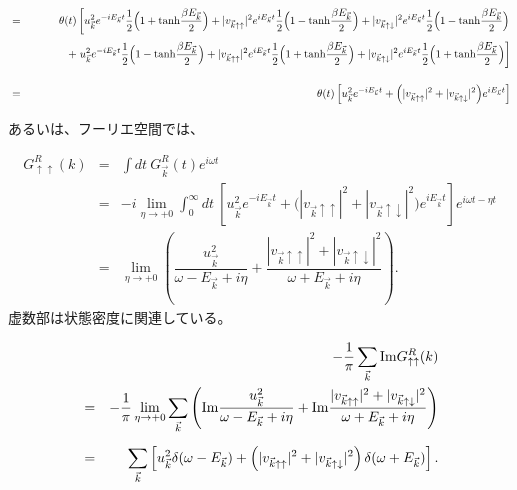\documentclass[uplatex,a4j,12pt,dvipdfmx]{jsarticle}
\begin{document}
\begin{eqnarray}
	&=&
	\theta(t)
	\left[
		u_{\vec{k}}^{2}
		e^{ - i E_{\vec{k}} t }
		\dfrac{1}{2}
		\Big( 1 + {\rm tanh}\dfrac{\beta E_{\vec{k}}}{2} \Big)
		+
		|v_{\vec{k} \uparrow \uparrow}|^{2}
		e^{ i E_{\vec{k}} t }
		\dfrac{1}{2}
		\Big( 1 - {\rm tanh}\dfrac{\beta E_{\vec{k}}}{2} \Big)
		+
		|v_{\vec{k} \uparrow \downarrow}|^{2}
		e^{ i E_{\vec{k}} t }
		\dfrac{1}{2}
		\Big( 1 - {\rm tanh}\dfrac{\beta E_{\vec{k}}}{2} \Big)
		\right.
		\nonumber \\[1mm] && \hspace{12mm} +
	\left.
	u_{\vec{k}}^{2}
	e^{ - i E_{\vec{k}} t }
	\dfrac{1}{2}
	\Big( 1 - {\rm tanh}\dfrac{\beta E_{\vec{k}}}{2} \Big)
	+
	|v_{\vec{k} \uparrow \uparrow}|^{2}
	e^{ i E_{\vec{k}} t }
	\dfrac{1}{2}
	\Big( 1 + {\rm tanh}\dfrac{\beta E_{\vec{k}}}{2} \Big)
	+
	|v_{\vec{k} \uparrow \downarrow}|^{2}
	e^{ i E_{\vec{k}} t }
	\dfrac{1}{2}
	\Big( 1 + {\rm tanh}\dfrac{\beta E_{\vec{k}}}{2} \Big)
	\right]
	\nonumber \\[4mm]
	&=&
	\theta(t)
	\left[
		u_{\vec{k}}^{2}
		e^{ - i E_{\vec{k}} t }
		+
		\Big(
		|v_{\vec{k} \uparrow \uparrow}|^{2}
		+
		|v_{\vec{k} \uparrow \downarrow}|^{2}
		\Big)
		e^{ i E_{\vec{k}} t }
		\right]
\end{eqnarray}


あるいは、フーリエ空間では、

\begin{eqnarray}
	G^{R}_{\uparrow \uparrow}(k)
	&=&
	\int \! dt \
	G^{R}_{\vec{k}}(t)
	e^{i \omega t}
	\nonumber \\[2mm] &=&
	-
	i
	\lim_{\eta \to +0}
	\int^{\infty}_{0} \!\! dt \
	\left[
		u_{\vec{k}}^{2}
		e^{ - i E_{\vec{k}} t }
		+
		\Big(
		|v_{\vec{k} \uparrow \uparrow}|^{2}
		+
		|v_{\vec{k} \uparrow \downarrow}|^{2}
		\Big)
		e^{ i E_{\vec{k}} t }
		\right]
	e^{i \omega t - \eta t}
	\nonumber \\[2mm] &=&
	\lim_{\eta \to +0}
	\left(
	\dfrac{u_{\vec{k}}^{2}}{ \omega - E_{\vec{k}} + i \eta }
	+
	\dfrac{
		|v_{\vec{k} \uparrow \uparrow}|^{2}
		+
		|v_{\vec{k} \uparrow \downarrow}|^{2}
	}{ \omega + E_{\vec{k}} + i \eta }
	\right)
	.
\end{eqnarray}
%
虚数部は状態密度に関連している。

\begin{eqnarray}
	&&
	- \dfrac{ 1 }{ \pi }
	\sum_{\vec{k}}
	{\rm Im} G^{R}_{\uparrow \uparrow}(k)
	\nonumber \\ &=&
	-
	\dfrac{1}{\pi}
	\lim_{\eta \to +0}
	\sum_{\vec{k}}
	\left(
	{\rm Im}
	\dfrac{u_{\vec{k}}^{2}}{ \omega - E_{\vec{k}} + i \eta }
	+
	{\rm Im}
	\dfrac{ |v_{\vec{k} \uparrow \uparrow}|^{2}
		+
		|v_{\vec{k} \uparrow \downarrow}|^{2}}{ \omega + E_{\vec{k}} + i \eta }
	\right)
	\nonumber \\[2mm] &=&
	\sum_{\vec{k}}
	\left[
		u_{\vec{k}}^{2}
		\delta( \omega - E_{\vec{k}} )
		+
		\left( |v_{\vec{k} \uparrow \uparrow}|^{2}
		+
		|v_{\vec{k} \uparrow \downarrow}|^{2} \right)
		\delta( \omega + E_{\vec{k}} )
		\right]
	.
\end{eqnarray}
\end{document}
